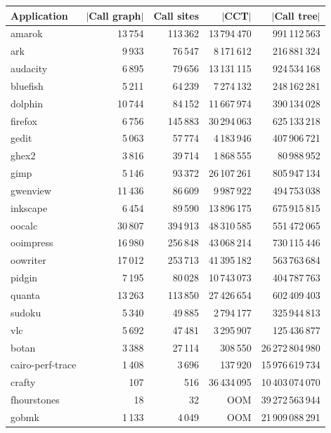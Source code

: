 \begin{table}[ht]
\begin{small}
\ifauthorea{}{\centering}
\begin{tabular}{|l|r r r r|}
\hline
Application & $|$Call graph$|$ & Call sites & $|$CCT$|$ & $|$Call tree$|$\\
\hline
amarok & 13\,754 & 113\,362 & 13\,794\,470 & 991\,112\,563 \\
ark & 9\,933 & 76\,547 & 8\,171\,612 & 216\,881\,324 \\
audacity & 6\,895 & 79\,656 & 13\,131\,115 & 924\,534\,168 \\
bluefish & 5\,211 & 64\,239 & 7\,274\,132 & 248\,162\,281 \\
dolphin & 10\,744 & 84\,152 & 11\,667\,974 & 390\,134\,028 \\
firefox & 6\,756 & 145\,883 & 30\,294\,063 & 625\,133\,218 \\
gedit & 5\,063 & 57\,774 & 4\,183\,946 & 407\,906\,721 \\
ghex2 & 3\,816 & 39\,714 & 1\,868\,555 & 80\,988\,952 \\
gimp & 5\,146 & 93\,372 & 26\,107\,261 & 805\,947\,134 \\
gwenview & 11\,436 & 86\,609 & 9\,987\,922 & 494\,753\,038 \\
inkscape & 6\,454 & 89\,590 & 13\,896\,175 & 675\,915\,815 \\
oocalc & 30\,807 & 394\,913 & 48\,310\,585 & 551\,472\,065 \\
ooimpress & 16\,980 & 256\,848 & 43\,068\,214 & 730\,115\,446 \\
oowriter & 17\,012 & 253\,713 & 41\,395\,182 & 563\,763\,684 \\
pidgin & 7\,195 & 80\,028 & 10\,743\,073 & 404\,787\,763 \\
quanta & 13\,263 & 113\,850 & 27\,426\,654 & 602\,409\,403 \\
sudoku & 5\,340 & 49\,885 & 2\,794\,177 & 325\,944\,813 \\
vlc & 5\,692 & 47\,481 & 3\,295\,907 & 125\,436\,877 \\
botan & 3\,388 & 27\,114 & 308\,550 & 26\,272\,804\,980 \\
cairo-perf-trace & 1\,408 & 3\,696 & 137\,920 & 15\,976\,619\,734 \\
crafty & 107 & 516 & 36\,434\,095 & 10\,403\,074\,070 \\
fhourstones & 18 & 32 & OOM & 39\,272\,563\,944 \\
gobmk & 1\,133 & 4\,049 & OOM & 21\,909\,088\,291 \\

\end{tabular}
\end{small}
\end{table}
